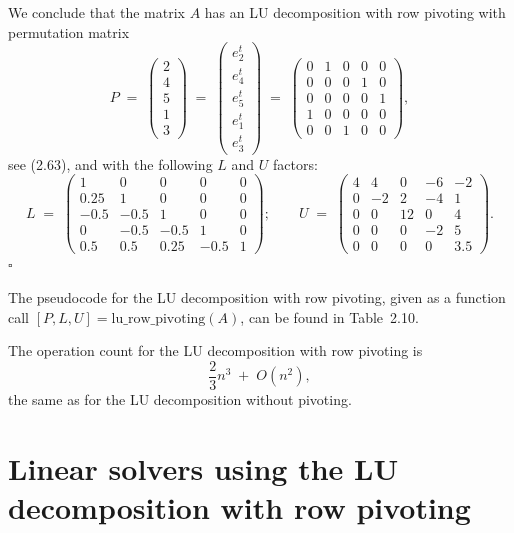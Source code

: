 We conclude that the matrix $A$ has an LU decomposition with row pivoting
with permutation matrix
\[
P \;=\; \begin{pmatrix} 2\\ 4\\ 5\\ 1\\ 3 \end{pmatrix}
\;=\;
\begin{pmatrix} e_2^t\\ e_4^t\\ e_5^t\\ e_1^t\\ e_3^t \end{pmatrix}
\;=\;
\begin{pmatrix}
0 & 1 & 0 & 0 & 0\\
0 & 0 & 0 & 1 & 0\\
0 & 0 & 0 & 0 & 1\\
1 & 0 & 0 & 0 & 0\\
0 & 0 & 1 & 0 & 0
\end{pmatrix},
\]
see (2.63), and with the following $L$ and $U$ factors:
\[
L \;=\;
\begin{pmatrix}
1 & 0 & 0 & 0 & 0\\
0.25 & 1 & 0 & 0 & 0\\
-0.5 & -0.5 & 1 & 0 & 0\\
0 & -0.5 & -0.5 & 1 & 0\\
0.5 & 0.5 & 0.25 & -0.5 & 1
\end{pmatrix}
;\qquad
U \;=\;
\begin{pmatrix}
4 & 4 & 0 & -6 & -2\\
0 & -2 & 2 & -4 & 1\\
0 & 0 & 12 & 0 & 4\\
0 & 0 & 0 & -2 & 5\\
0 & 0 & 0 & 0 & 3.5
\end{pmatrix}.
\]
\hfill$\square$\par\medskip

The pseudocode for the LU decomposition with row pivoting, given as a
function call $[P,L,U]=\text{lu\_row\_pivoting}(A)$, can be found in
Table~2.10.

The operation count for the LU decomposition with row pivoting is
\[
\frac{2}{3}n^3 \;+\; O(n^2),
\]
the same as for the LU decomposition without pivoting.

\section{Linear solvers using the LU decomposition with row pivoting}


